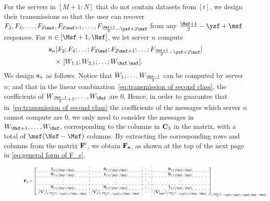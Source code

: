 \documentclass[conference,letterpaper]{IEEEtran}
\begin{document}
For the servers in $[M+1 : N]$ that do not contain datasets from $[t]$, we design their transmissions so that the user can recover $F_2, F_4, \ldots, F_{2\msf}, F_{2\msf+1}, \ldots, F_{\frac{\Msf+1}{2} - \ysf + 2\msf}$ from any $\frac{\Msf+1}{2} - \ysf + \msf$ responses.
 For $n \in [\Msf+1, \Nsf]$, we let server $n$ compute
\begin{align}
{\bf s}_n  & [ F_2; F_4; \ldots; F_{2\msf}; F_{2\msf+1}; \ldots; F_{\frac{\Msf+1}{2} - \ysf + 2\msf} ]  \nonumber \\
& \text{× }  [ W_{1,1}; W_{2,1}; \ldots; W_{\Nsf,\msf} ] .
\label{eq:transmission of second class}
\end{align}
We design ${\bf s}_{n} $ as follows.
Notice that $W_1, \ldots, W_{\frac{\Msf-1}{2}}$ can be computed by server $n$; and that in the linear combination~\eqref{eq:transmission of second class}, the coefficients of $W_{\frac{\Msf-1}{2}+1}, \ldots, W_{\Msf}$ are $0$. 
Hence, in order to guarantee that in~\eqref{eq:transmission of second class} the coefficients of the messages which server $n$ cannot compute are $0$, we only need to consider the messages in $W_{\Msf+1}, \ldots, W_{\Nsf}$, corresponding to the columns in ${\bf C}_3$ in the matrix, with a total of $\msf (\Nsf - \Msf)$ columns.
By extracting the corresponding rows and columns from the matrix \( {\bf F}' \), we obtain \( {\bf F}_{\bf s} \), as shown at the top of the next page in \eqref{eq:general form of F_s},
\begin{figure*}
\begin{equation}
\scalebox{0.8}{$
 {\bf F}_{\bf s} = 
\left[
\begin{array}{c:c:c:c}
{\bf 1}_{1 \times (\Nsf-\Msf)}  & {\bf 0}_{1 \times (\Nsf-\Msf)}  & \cdots & {\bf 0}_{1 \times (\Nsf-\Msf)}   \\ \hdashline
{\bf 0}_{1 \times (\Nsf-\Msf)} &  {\bf 1}_{1 \times (\Nsf-\Msf)}   & \cdots & {\bf 0}_{1 \times (\Nsf-\Msf)}   \\ \hdashline 
 \vdots   & \vdots  &  \ddots & \vdots \\ \hdashline
 {\bf 0}_{1 \times (\Nsf-\Msf)} &   {\bf 0}_{1 \times (\Nsf-\Msf)}    & \cdots &  {\bf 1}_{1 \times (\Nsf-\Msf)} \\ \hdashline
 ({\bf V}'_{1})_{ (\frac{\Msf + 1}{2} - \ysf) \times (\Nsf-\Msf)}  &  ({\bf V}'_{2})_{ (\frac{\Msf + 1}{2} - \ysf) \times (\Nsf-\Msf)}  &   \cdots   &   ({\bf V}'_{\msf})_{ (\frac{\Msf + 1}{2} - \ysf) \times (\Nsf-\Msf)} 
 \end{array}
\right]_{(\frac{\Msf + 1}{2} - \ysf + \msf) \times \msf(\Nsf-\Msf)}
$}
\label{eq:general form of F_s}
\end{equation}

\end{figure*}
\end{document}
